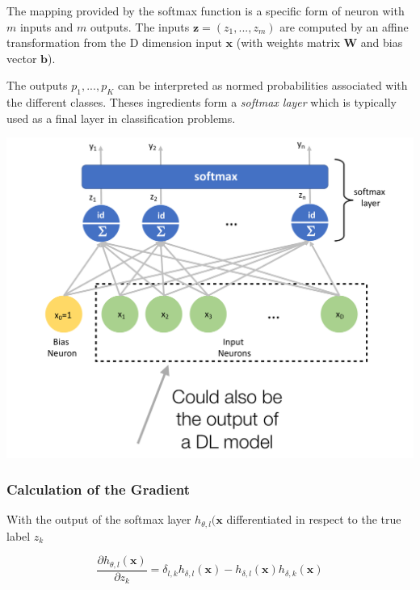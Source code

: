 \documentclass[11pt]{article}
\begin{document}
\noindent
\begin{minipage}{0.5\linewidth}
	The mapping provided by the softmax function is a specific form of neuron with $m$ inputs and $m$ outputs. The inputs $\textbf{z} = (z_1,...,z_m)$ are computed by an affine transformation from the D dimension input $\textbf{x}$ (with weights matrix $\textbf{W}$ and bias vector $\textbf{b}$).
	
	The outputs $p_1, ..., p_K$ can be interpreted as normed probabilities associated with the different classes. Theses ingredients form a \emph{softmax layer} which is typically used as a final layer in classification problems.
\end{minipage}
\begin{minipage}{0.5\linewidth}
	\centering
	\includegraphics[width=\linewidth]{softmax_layer}
\end{minipage}

\subsubsection{Calculation of the Gradient}

With the output of the softmax layer $h_{\theta, l}(\textbf{x}$ differentiated in respect to the true label $z_k$

\begin{equation*}
	\frac{\partial h_{\theta, l}(\textbf{x})}{\partial z_k} = \delta_{l,k}h_{\delta,l}(\textbf{x}) - h_{\delta, l}(\textbf{x})h_{\delta, k}(\textbf{x})
\end{equation*}
\end{document}

